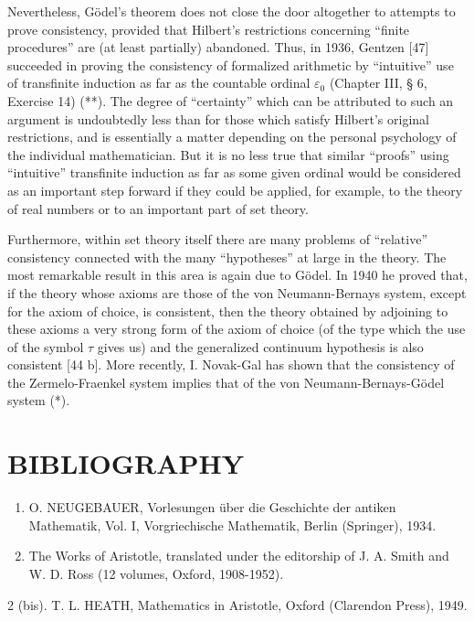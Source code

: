 Nevertheless, Gödel's theorem does not close the door altogether to attempts to prove consistency, provided that Hilbert's restrictions concerning ``finite procedures'' are (at least partially) abandoned. Thus, in 1936, Gentzen {[}47{]} succeeded in proving the consistency of formalized arithmetic by ``intuitive'' use of transfinite induction as far as the countable ordinal \(\varepsilon_0\) (Chapter III, § 6, Exercise 14) (**). The degree of ``certainty'' which can be attributed to such an argument is undoubtedly less than for those which satisfy Hilbert's original restrictions, and is essentially a matter depending on the personal psychology of the individual mathematician. But it is no less true that similar ``proofs'' using ``intuitive'' transfinite induction as far as some given ordinal would be considered as an important step forward if they could be applied, for example, to the theory of real numbers or to an important part of set theory.

Furthermore, within set theory itself there are many problems of ``relative'' consistency connected with the many ``hypotheses'' at large in the theory. The most remarkable result in this area is again due to Gödel. In 1940 he proved that, if the theory whose axioms are those of the von Neumann-Bernays system, except for the axiom of choice, is consistent, then the theory obtained by adjoining to these axioms a very strong form of the axiom of choice (of the type which the use of the symbol \(\tau\) gives us) and the generalized continuum hypothesis is also consistent {[}44 b{]}. More recently, I. Novak-Gal has shown that the consistency of the Zermelo-Fraenkel system implies that of the von Neumann-Bernays-Gödel system (*).

\section*{BIBLIOGRAPHY}
{}

\begin{enumerate}
\def\labelenumi{\arabic{enumi}.}
\item
  O. NEUGEBAUER, Vorlesungen über die Geschichte der antiken Mathematik, Vol. I, Vorgriechische Mathematik, Berlin (Springer), 1934.
\item
  The Works of Aristotle, translated under the editorship of J. A. Smith and W. D. Ross (12 volumes, Oxford, 1908-1952).
\end{enumerate}

2 (bis). T. L. HEATH, Mathematics in Aristotle, Oxford (Clarendon Press), 1949.

